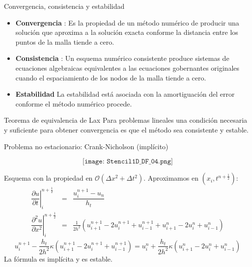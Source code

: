 \documentclass[handout]{beamer}
\begin{document}
\begin{frame}{Convergencia, consistencia y estabilidad}
\begin{itemize}[<+->]
\item \textbf{Convergencia} : 
Es la propiedad de un m\'etodo num\'erico de producir una soluci\'on 
que aproxima a la soluci\'on exacta conforme la distancia entre los 
puntos de la malla tiende a cero. 
\item \textbf{Consistencia} :
Un esquema num\'erico consistente produce sistemas de ecuaciones 
algebraicas equivalentes a las ecuaciones gobernantes originales 
cuando el espaciamiento de los nodos de la malla tiende a cero. 
\item \textbf{Estabilidad}
La estabilidad est\'a asociada con la amortiguaci\'on del error 
conforme el m\'etodo num\'erico procede. 
\end{itemize}

\pause

\begin{block}{Teorema de equivalencia de Lax}
Para problemas lineales una condici\'on necesaria y suficiente 
para obtener convergencia es que el m\'etodo sea consistente y estable. 
\end{block}

\end{frame}

\begin{frame}{Problema no estacionario: Crank-Nicholson (impl\'icito)}

$$\texttt{[image: Stencil1D\_DF\_04.png]}$$

\begin{small}
	
Esquema con la propiedad  en $\mathcal{O}(\Delta x^2 + \Delta t^2)$. Aproximamos en $(x_i,t^{n+\frac{1}{2}})$:
	\begin{eqnarray*}
	\left.\dfrac{\partial u}{\partial t}\right|_{i}^{n+\frac{1}{2}} & = & \dfrac{u_{i}^{n+1} - u_{n}}{h_t} \\ 	
	 \left.\dfrac{\partial^2 u}{\partial x^2}\right|_{i}^{n+\frac{1}{2}} & = & \frac{1}{2 h^2}  \left(u_{i+1}^{n+1} - 2 u_{i}^{n+1} + 
	u_{i-1}^{n+1} + u_{i+1}^{n} - 2 u_{i}^{n} + u_{i-1}^{n}\right)
	\end{eqnarray*}	
	\begin{displaymath}
	\boxed{u_{i}^{n+1} -  \frac{h_t}{2 h^2}  \kappa \left(u_{i+1}^{n+1} - 2 u_{i}^{n+1} + 
	u_{i-1}^{n+1}\right) = u_{i}^{n} + \frac{h_t}{2 h^2}  \kappa \left(u_{i+1}^{n} - 2 u_{i}^{n} + u_{i-1}^{n}\right)}
	\end{displaymath}
	La f\'ormula es impl\'icita y es estable.
	
\end{small}

\end{frame}
\end{document}
